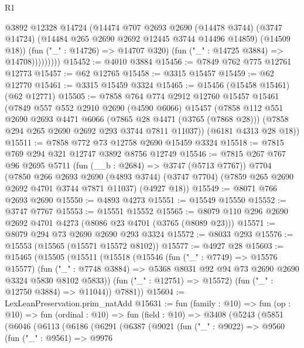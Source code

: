 \begin{lexlean}{R1}
\begin{coremodule}
                    @3892
                    @12328
                    @14724
                    (@14474
                      @707
                      @2693
                      @2690
                      (@14478 @3744)
                      (@3747 @14724)
                      (@14484 @265 @2690 @2692 @12445 @3744 @14496 @14859)
                      (@14509 @18))
                    (fun ("_" : @14726) => @14707 @320)
                    (fun ("_" : @14725 @3884) => @14708)))))))))
@15452 := @4010 @3884
@15456 := @7849 @762 @775 @12761 @12773
@15457 := @62 @12765
@15458 := @3315 @15457
@15459 := @62 @12770
@15461 := @3315 @15459 @3324
@15465 := @15456 (@15458 @15461) (@62 @12771)
@15505 := @7858
    @764
    @774
    @2912
    @12760
    @15457
    @15461
    (@7849
      @557
      @552
      @2910
      @2690
      (@4590 @6066)
      @15457
      (@7858
        @112
        @551
        @2690
        @2693
        @4471
        @6066
        (@7865 @28 @4471 (@3765 (@7868 @28)))
        (@7858 @294 @265 @2690 @2692 @293 @3744 @7811 @11037))
      (@6181 @4313 @28 @18))
@15511 := @7858 @772 @73 @12758 @2690 @15459 @3324
@15518 := @7815 @769 @294 @321 @12747 @3892 @8756 @12749
@15546 := @7815
    @267
    @767
    @96
    @2695
    @5711
    (fun (__b : @2684) => @3747 (@5713 @7767))
    @7704
    (@7850
      @266
      @2693
      @2690
      (@4893 @3744)
      (@3747 @7704)
      (@7859 @265 @2690 @2692 @4701 @3744 @7871 @11037)
      (@4927 @18))
@15549 := @8071 @766 @2693 @2690
@15550 := @4893 @4273
@15551 := @15549 @15550
@15552 := @3747 @7767
@15553 := @15551 @15552
@15565 := @8079 @110 @296 @2690 @2692 @4701 @4273 (@8086 @23 @4701 (@3765 (@8089 @23)))
@15571 := @8079 @294 @73 @2690 @2690 @293 @3324
@15572 := @8033 @293
@15576 := @15553 (@15565 (@15571 @15572 @8102))
@15577 := @4927 @28
@15603 := @15465
    (@15505
      (@15511
        (@15518
          (@15546
            (fun ("_" : @7749) => @15576 @15577)
            (fun ("_" : @7748 @3884) =>
            @5368 @8031 @92 @94 @73 @2690 @2690 @3324 @5830 @8102 @5833))
          (fun ("_" : @12751) => @15572)
          (fun ("_" : @12750 @3884) => @11044))
        @7881))
@15604 := LexLeanPreservation.prim_natAdd
@15631 := fun (family : @10) =>
  fun (op : @10) =>
  fun (ordinal : @10) =>
  fun (field : @10) =>
  @3408
    (@5243
      (@5851
        (@6046
          (@6113
            (@6186
              (@6291
                (@6387
                  (@9021
                    (fun ("_" : @9022) =>
                    @9560
                      (fun ("_" : @9561) =>
                      @9976

\end{coremodule}
\end{lexlean}
